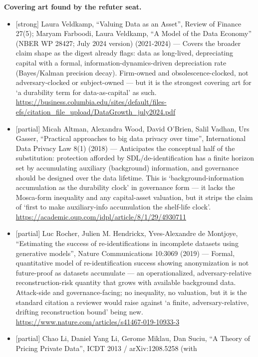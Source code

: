 \documentclass[
  11pt,
]{article}
\providecommand{\tightlist}{%
  \setlength{\itemsep}{0pt}\setlength{\parskip}{0pt}}
\begin{document}
\textbf{Covering art found by the refuter seat.}

\begin{itemize}
\tightlist
\item
  {[}strong{]} Laura Veldkamp, ``Valuing Data as an Asset'', Review of
  Finance 27(5); Maryam Farboodi, Laura Veldkamp, ``A Model of the Data
  Economy'' (NBER WP 28427; July 2024 version) (2021-2024) --- Covers
  the broader claim shape as the digest already flags: data as
  long-lived, depreciating capital with a formal,
  information-dynamics-driven depreciation rate (Bayes/Kalman precision
  decay). Firm-owned and obsolescence-clocked, not adversary-clocked or
  subject-owned --- but it is the strongest covering art for `a
  durability term for data-as-capital' as such.
  \url{https://business.columbia.edu/sites/default/files-efs/citation_file_upload/DataGrowth_july2024.pdf}
\item
  {[}partial{]} Micah Altman, Alexandra Wood, David O'Brien, Salil
  Vadhan, Urs Gasser, ``Practical approaches to big data privacy over
  time'', International Data Privacy Law 8(1) (2018) --- Anticipates the
  conceptual half of the substitution: protection afforded by
  SDL/de-identification has a finite horizon set by accumulating
  auxiliary (background) information, and governance should be designed
  over the data lifetime. This is `background-information accumulation
  as the durability clock' in governance form --- it lacks the
  Mosca-form inequality and any capital-asset valuation, but it strips
  the claim of `first to make auxiliary-info accumulation the shelf-life
  clock'. \url{https://academic.oup.com/idpl/article/8/1/29/4930711}
\item
  {[}partial{]} Luc Rocher, Julien M. Hendrickx, Yves-Alexandre de
  Montjoye, ``Estimating the success of re-identifications in incomplete
  datasets using generative models'', Nature Communications 10:3069
  (2019) --- Formal, quantitative model of re-identification success
  showing anonymization is not future-proof as datasets accumulate ---
  an operationalized, adversary-relative reconstruction-risk quantity
  that grows with available background data. Attack-side and
  governance-facing; no inequality, no valuation, but it is the standard
  citation a reviewer would raise against `a finite, adversary-relative,
  drifting reconstruction bound' being new.
  \url{https://www.nature.com/articles/s41467-019-10933-3}
\item
  {[}partial{]} Chao Li, Daniel Yang Li, Gerome Miklau, Dan Suciu, ``A
  Theory of Pricing Private Data'', ICDT 2013 / arXiv:1208.5258 (with

\end{itemize}
\end{document}
